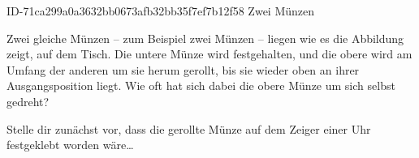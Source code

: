 \begin{exercise}
      {ID-71ca299a0a3632bb0673afb32bb35f7ef7b12f58}
      {Zwei Münzen}
  \ifproblem\problem\par
    Zwei gleiche Münzen -- zum Beispiel zwei  Münzen -- liegen wie es
    die Abbildung zeigt, auf dem Tisch. Die untere Münze wird festgehalten, und die
    obere wird am Umfang der anderen um sie herum gerollt, bis sie wieder oben an
    ihrer Ausgangsposition liegt. Wie oft hat sich dabei die obere Münze um sich
    selbst gedreht?
    \begin{center}
    \end{center}
  \fi
  \ifoutline\outline\par
    Stelle dir zunächst vor, dass die gerollte Münze auf dem Zeiger einer Uhr
    festgeklebt worden wäre\ldots
  \fi
\end{exercise}
